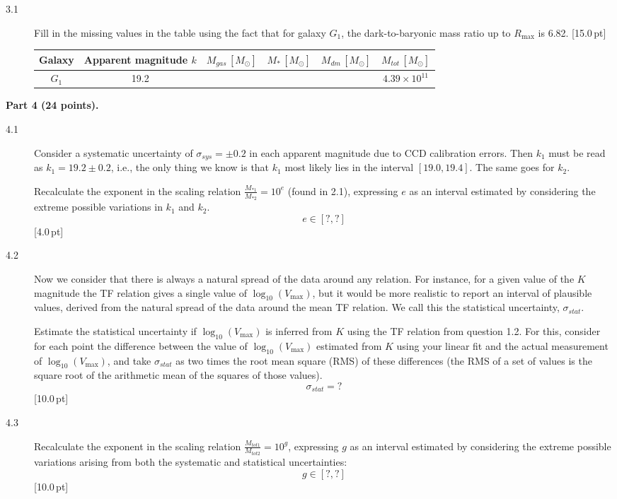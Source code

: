 \begin{description}
\item[3.1] Fill in the missing values in the table using the fact that for
  galaxy $G_1$, the dark-to-baryonic mass ratio up to $R_{\max}$ is 6.82.
  \hfill[15.0\,pt]

  \begin{center}
  \begin{tabular}{cccccc}
  Galaxy & Apparent magnitude $k$ & $M_{gas}\,[M_\odot]$ & $M_*\,[M_\odot]$ &
  $M_{dm}\,[M_\odot]$ & $M_{tot}\,[M_\odot]$ \\
  \hline
  $G_1$ & 19.2 & & & & $4.39 \times 10^{11}$ \\
  \end{tabular}
  \end{center}
\end{description}

\medskip
\textbf{Part 4 (24 points).}

\begin{description}
\item[4.1] Consider a systematic uncertainty of $\sigma_{sys} = \pm 0.2$ in
  each apparent magnitude due to CCD calibration errors. Then $k_1$ must be
  read as $k_1 = 19.2 \pm 0.2$, i.e., the only thing we know is that $k_1$
  most likely lies in the interval $[19.0, 19.4]$. The same goes for $k_2$.

  Recalculate the exponent in the scaling relation
  $\frac{M_{*1}}{M_{*2}} = 10^e$ (found in 2.1), expressing $e$ as an
  interval estimated by considering the extreme possible variations in $k_1$
  and $k_2$.
  \[ e \in [?, ?] \]
  \hfill[4.0\,pt]
\item[4.2] Now we consider that there is always a natural spread of the data
  around any relation. For instance, for a given value of the $K$ magnitude
  the TF relation gives a single value of $\log_{10}(V_{\max})$, but it would
  be more realistic to report an interval of plausible values, derived from
  the natural spread of the data around the mean TF relation. We call this
  the statistical uncertainty, $\sigma_{stat}$.

  Estimate the statistical uncertainty if $\log_{10}(V_{\max})$ is inferred
  from $K$ using the TF relation from question 1.2. For this, consider for
  each point the difference between the value of $\log_{10}(V_{\max})$
  estimated from $K$ using your linear fit and the actual measurement of
  $\log_{10}(V_{\max})$, and take $\sigma_{stat}$ as two times the root mean
  square (RMS) of these differences (the RMS of a set of values is the square
  root of the arithmetic mean of the squares of those values).
  \[ \sigma_{stat} = ? \]
  \hfill[10.0\,pt]
\item[4.3] Recalculate the exponent in the scaling relation
  $\frac{M_{tot1}}{M_{tot2}} = 10^g$, expressing $g$ as an interval estimated
  by considering the extreme possible variations arising from both the
  systematic and statistical uncertainties:
  \[ g \in [?, ?] \]
  \hfill[10.0\,pt]
\end{description}

